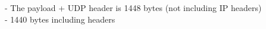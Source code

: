 - The payload + UDP header is 1448 bytes (not including IP headers) \\
- 1440 bytes including headers
